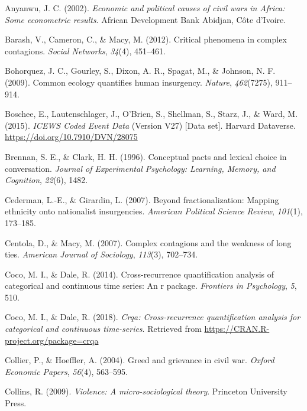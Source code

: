 \documentclass[
  english,
  man]{apa6}
\begin{document}
\leavevmode\hypertarget{ref-anyanwu2002economic}{}%
Anyanwu, J. C. (2002). \emph{Economic and political causes of civil wars in Africa: Some econometric results}. African Development Bank Abidjan, Côte d'Ivoire.

\leavevmode\hypertarget{ref-barash2012critical}{}%
Barash, V., Cameron, C., \& Macy, M. (2012). Critical phenomena in complex contagions. \emph{Social Networks}, \emph{34}(4), 451--461.

\leavevmode\hypertarget{ref-bohorquez2009common}{}%
Bohorquez, J. C., Gourley, S., Dixon, A. R., Spagat, M., \& Johnson, N. F. (2009). Common ecology quantifies human insurgency. \emph{Nature}, \emph{462}(7275), 911--914.

\leavevmode\hypertarget{ref-DVNux2f28075_2015}{}%
Boschee, E., Lautenschlager, J., O'Brien, S., Shellman, S., Starz, J., \& Ward, M. (2015). \emph{ICEWS Coded Event Data} (Version V27) {[}Data set{]}. Harvard Dataverse. \url{https://doi.org/10.7910/DVN/28075}

\leavevmode\hypertarget{ref-brennan1996conceptual}{}%
Brennan, S. E., \& Clark, H. H. (1996). Conceptual pacts and lexical choice in conversation. \emph{Journal of Experimental Psychology: Learning, Memory, and Cognition}, \emph{22}(6), 1482.

\leavevmode\hypertarget{ref-cederman2007beyond}{}%
Cederman, L.-E., \& Girardin, L. (2007). Beyond fractionalization: Mapping ethnicity onto nationalist insurgencies. \emph{American Political Science Review}, \emph{101}(1), 173--185.

\leavevmode\hypertarget{ref-centola2007complex}{}%
Centola, D., \& Macy, M. (2007). Complex contagions and the weakness of long ties. \emph{American Journal of Sociology}, \emph{113}(3), 702--734.

\leavevmode\hypertarget{ref-coco2014cross}{}%
Coco, M. I., \& Dale, R. (2014). Cross-recurrence quantification analysis of categorical and continuous time series: An r package. \emph{Frontiers in Psychology}, \emph{5}, 510.

\leavevmode\hypertarget{ref-R-crqa}{}%
Coco, M. I., \& Dale, R. (2018). \emph{Crqa: Cross-recurrence quantification analysis for categorical and continuous time-series}. Retrieved from \url{https://CRAN.R-project.org/package=crqa}

\leavevmode\hypertarget{ref-collier2004greed}{}%
Collier, P., \& Hoeffler, A. (2004). Greed and grievance in civil war. \emph{Oxford Economic Papers}, \emph{56}(4), 563--595.

\leavevmode\hypertarget{ref-collins2009violence}{}%
Collins, R. (2009). \emph{Violence: A micro-sociological theory}. Princeton University Press.
\end{document}

